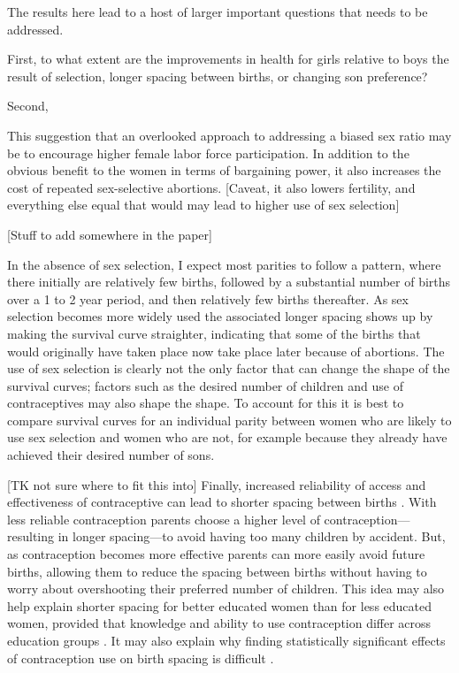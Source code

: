 \documentclass[12pt,letterpaper]{article}
\begin{document}
The results here lead to a host of larger important questions that
needs to be addressed.

First, to what extent are the improvements in health for girls
relative to boys the result of selection, longer spacing between
births, or changing son preference?

Second, 

This suggestion that an overlooked approach to addressing a biased
sex ratio may be to encourage higher female labor force participation.
In addition to the obvious benefit to the women in terms of 
bargaining power, it also increases the cost of repeated 
sex-selective abortions.
[Caveat, it also lowers fertility, and everything else equal that
would may lead to higher use of sex selection]


[Stuff to add somewhere in the paper]

In the absence of sex selection, I expect most parities to follow
a pattern, where there initially are relatively few births, 
followed by a substantial number of births over a 1 to 2 year period, and then
relatively few births thereafter.
As sex selection becomes more widely used the associated
longer spacing shows up by making the survival curve straighter,
indicating that some of the births that would originally have taken place
now take place later because of abortions.
The use of sex selection is clearly not the only factor that can change the shape of
the survival curves; factors such as the desired number of children and
use of contraceptives may also shape the shape.
To account for this it is best to compare survival curves for an individual
parity between women who are likely to use sex selection and women who are
not, for example because they already have achieved their desired 
number of sons.



[TK not sure where to fit this into]
Finally, increased reliability of access and effectiveness of
contraceptive can lead to shorter spacing between births 
\citep{Keyfitz1971,Heckman1976}.
With less reliable contraception parents choose a higher level 
of contraception---resulting in longer spacing---to avoid having 
too many children by accident.
But, as contraception becomes more effective parents can more
easily avoid future births, allowing them to reduce the spacing 
between births without having to worry about overshooting their 
preferred number of children.
This idea may also help explain shorter spacing for better 
educated women than for less educated women, provided that   
knowledge and ability to use contraception differ
across education groups \citep{Tulasidhar1993,Whitworth2002}.
It may also explain why finding statistically significant
effects of contraception use on birth spacing is difficult \citep{Yeakey2009}.
\end{document}
